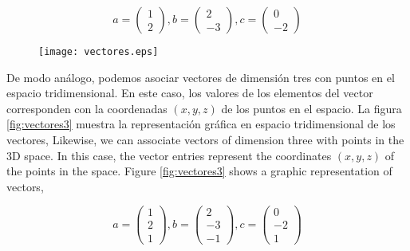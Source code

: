 \begin{equation*}
a=
\begin{pmatrix}
1\\
2
\end{pmatrix},
b=
\begin{pmatrix}
2\\
-3
\end{pmatrix},
c=
\begin{pmatrix}
0\\
-2
\end{pmatrix}
\end{equation*}


\begin{figure}[h]
\centering
\texttt{[image: vectores.eps]}
\label{fig:vectores}
\end{figure}

\begin{paracol}{2}
De modo análogo, podemos asociar vectores de dimensión tres con puntos en el espacio tridimensional. En este caso, los valores de los elementos del vector corresponden con la coordenadas $(x,y,z)$ de los puntos en el espacio. La figura \ref{fig:vectores3} muestra la representación gráfica en espacio tridimensional de los vectores,
\switchcolumn
Likewise, we can associate vectors of dimension three with points in the 3D space. In this case, the vector entries represent the coordinates $(x,y,z)$ of the points in the space. Figure \ref{fig:vectores3} shows a graphic representation of vectors,
\end{paracol}
\begin{equation*}
a=
\begin{pmatrix}
1\\
2\\
1
\end{pmatrix},
b=
\begin{pmatrix}
2\\
-3\\
-1
\end{pmatrix},
c=
\begin{pmatrix}
0\\
-2\\
1
\end{pmatrix}
\end{equation*}

